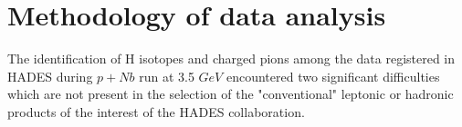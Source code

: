 


\section{Methodology of data analysis}
The identification of H isotopes and charged pions among the data registered in HADES during $p+Nb$ run at 3.5 $GeV$ encountered two significant difficulties which are not present in the selection of the "conventional" leptonic or hadronic products of the interest of the HADES collaboration.

